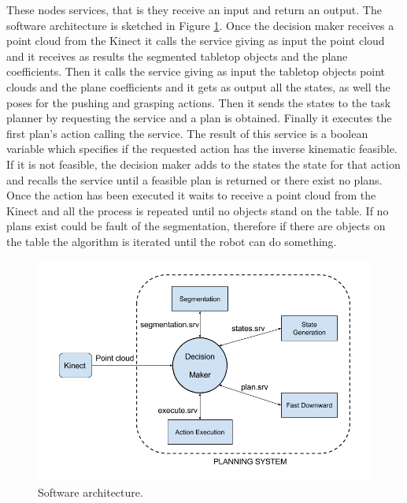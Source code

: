 These nodes  services, that is they  receive an input and return an output.
The software architecture is sketched in Figure \ref{fig:architecture}. 
Once the decision maker receives a point cloud from the Kinect it calls the   service giving as input the point cloud and it receives as results the segmented tabletop objects and the plane coefficients. Then it calls the  service giving as input the tabletop objects point clouds and the plane coefficients and it gets as output all the states, as well the poses for the pushing and grasping actions. Then it sends the states to the task planner by requesting the  service and a plan is obtained. Finally it executes the first plan's action calling the  service. The result of this service is a boolean variable which specifies if the requested action has the inverse kinematic feasible. If it is not feasible, the decision maker adds to the states the  state for that action and recalls the  service until a feasible plan is returned or there exist no plans.
Once the action has been executed it waits to receive a point cloud from the Kinect and all the process is repeated until no objects stand on the table. If no plans exist could be fault of the segmentation, therefore if there are objects on the table the algorithm is iterated until the robot can do something.
\begin{figure}[h]
\centering
\includegraphics[width=14cm]{Img/software/Software_arquitecture.png}
\caption{Software architecture.}\label{fig:architecture}
\end{figure}

